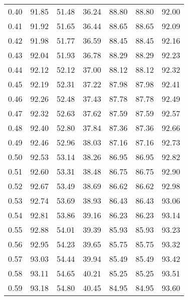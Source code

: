 \begin{tabular}{|c|c|c|c|c|c|c|}
      0.40 &     91.85 &     51.48 &      36.24 &   88.80 &      88.80 &         92.00 \\
      0.41 &     91.92 &     51.65 &      36.44 &   88.65 &      88.65 &         92.09 \\
      0.42 &     91.98 &     51.77 &      36.59 &   88.45 &      88.45 &         92.16 \\
      0.43 &     92.04 &     51.93 &      36.78 &   88.29 &      88.29 &         92.23 \\
      0.44 &     92.12 &     52.12 &      37.00 &   88.12 &      88.12 &         92.32 \\
      0.45 &     92.19 &     52.31 &      37.22 &   87.98 &      87.98 &         92.41 \\
      0.46 &     92.26 &     52.48 &      37.43 &   87.78 &      87.78 &         92.49 \\
      0.47 &     92.32 &     52.63 &      37.62 &   87.59 &      87.59 &         92.57 \\
      0.48 &     92.40 &     52.80 &      37.84 &   87.36 &      87.36 &         92.66 \\
      0.49 &     92.46 &     52.96 &      38.03 &   87.16 &      87.16 &         92.73 \\
      0.50 &     92.53 &     53.14 &      38.26 &   86.95 &      86.95 &         92.82 \\
      0.51 &     92.60 &     53.31 &      38.48 &   86.75 &      86.75 &         92.90 \\
      0.52 &     92.67 &     53.49 &      38.69 &   86.62 &      86.62 &         92.98 \\
      0.53 &     92.74 &     53.69 &      38.93 &   86.43 &      86.43 &         93.06 \\
      0.54 &     92.81 &     53.86 &      39.16 &   86.23 &      86.23 &         93.14 \\
      0.55 &     92.88 &     54.01 &      39.39 &   85.93 &      85.93 &         93.23 \\
      0.56 &     92.95 &     54.23 &      39.65 &   85.75 &      85.75 &         93.32 \\
      0.57 &     93.03 &     54.44 &      39.94 &   85.49 &      85.49 &         93.42 \\
      0.58 &     93.11 &     54.65 &      40.21 &   85.25 &      85.25 &         93.51 \\
      0.59 &     93.18 &     54.80 &      40.45 &   84.95 &      84.95 &         93.60 \\

\end{tabular}
